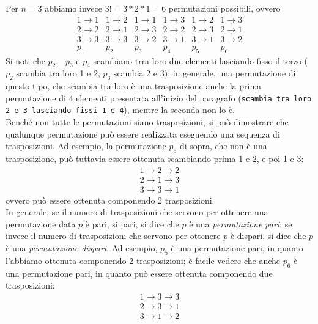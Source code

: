 Per $n=3$ abbiamo invece $3!=3*2*1=6$ permutazioni possibili, ovvero
\begin{equation*}
  \begin{matrix}
    1 \to 1 & 1 \to 2 & 1 \to 1 & 1 \to 3 & 1 \to 2 & 1 \to 3 \\
    2 \to 2 & 2 \to 1 & 2 \to 3 & 2 \to 2 & 2 \to 3 & 2 \to 1 \\
    3 \to 3 & 3 \to 3 & 3 \to 2 & 3 \to 1 & 3 \to 1 & 3 \to 2 \\
      p_1   &    p_2   &   p_3   &    p_4  &    p_5  &    p_6
  \end{matrix}
\end{equation*}
Si noti che $p_2, \text{ } p_3$ e $p_4$ scambiano trra loro due elementi lasciando fisso il terzo ($p_2$ scambia tra loro 1 e 2, $p_3$ scambia 2 e 3): in generale, una permutazione di questo tipo, che scambia tra loro è una trasposizione anche la prima permutazione di 4 elementi presentata all'inizio del paragrafo ({\tt scambia tra loro 2 e 3 lasciando fissi 1 e 4}), mentre la seconda non lo è.\\
Benché non tutte le permutazioni siano trasposizioni, si può dimostrare che qualunque permutazione può essere realizzata eseguendo una sequenza di trasposizioni. Ad esempio, la permutazione $p_5$ di sopra, che non è una trasposizione, può tuttavia essere ottenuta scambiando prima 1 e 2, e poi 1 e 3:
\begin{equation*}
  \begin{matrix}
    1 \to 2 \to 2\\
    2 \to 1 \to 3\\
    3 \to 3 \to 1
  \end{matrix}
\end{equation*}
ovvero può essere ottenuta componendo 2 trasposizioni.\\
In generale, se il numero di trasposizioni che servono per ottenere una permutazione data $p$ è pari, si pari, si dice che $p$ è una {\em permutazione pari}; se invece il numero di trasposizioni che servono per ottenere $p$ è dispari, si dice che $p$ è una {\em permutazione dispari}. Ad esempio, $p_5$ è una permutazione pari, in quanto l'abbiamo ottenuta componendo 2 trasposizioni; è facile vedere che anche $p_6$ è una permutazione pari, in quanto può essere ottenuta componendo due trasposizioni:
\begin{equation*}
  \begin{matrix}
    1 \to 3 \to 3\\
    2 \to 3 \to 1\\
    3 \to 1 \to 2
  \end{matrix}
\end{equation*}
